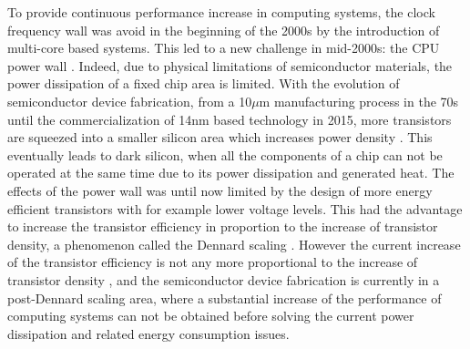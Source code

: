 \documentclass{article}
\begin{document}
To provide continuous performance increase in computing systems, the clock frequency wall was avoid in the beginning of the 2000s by the introduction of multi-core based systems. 
This led to a new challenge in mid-2000s: the CPU power wall \cite{Danowitz:12,Wang:13}. 
Indeed, due to physical limitations of semiconductor materials, the power dissipation of a fixed chip area is limited. 
With the evolution of semiconductor device fabrication, from a 10$\mu$m manufacturing process in the 70s until the commercialization of 14nm based technology in 2015, more transistors are squeezed into a smaller silicon area which increases power density \cite{5514312}. 
This eventually leads to dark silicon, when all the components of a chip can not be operated at the same time due to its power dissipation and generated heat. 
The effects of the power wall was until now limited by the design of more energy efficient transistors with for example lower voltage levels.
This had the advantage to increase the transistor efficiency in proportion to the increase of transistor density, a phenomenon called the Dennard scaling \cite{Dennard:74}. 
However the current increase of the transistor efficiency is not any more proportional to the increase of transistor density \cite{Wang:13}, 
and the semiconductor device fabrication is currently in a post-Dennard scaling area, where a substantial increase of the performance of computing
systems can not be obtained before solving the current power dissipation and related energy consumption issues.\smallskip
\end{document}
